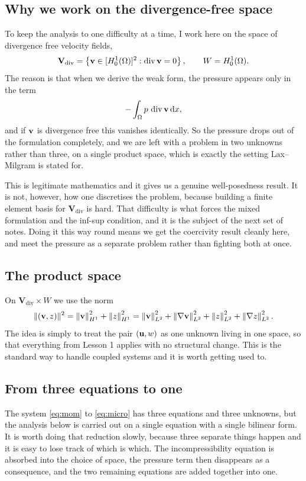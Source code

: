 \documentclass[11pt,a4paper]{article}
\begin{document}
\subsection{Why we work on the divergence-free space}

To keep the analysis to one difficulty at a time, I work here on the space of
divergence free velocity fields,
\[
  \mathbf{V}_{\mathrm{div}}
  = \left\{ \mathbf{v} \in [H^{1}_{0}(\Omega)]^{2} : \operatorname{div} \mathbf{v} = 0 \right\} ,
  \qquad
  W = H^{1}_{0}(\Omega) .
\]
The reason is that when we derive the weak form, the pressure appears only in
the term
\[
  - \int_\Omega p \,\operatorname{div} \mathbf{v} \,\mathrm{d}x ,
\]
and if $\mathbf{v}$ is divergence free this vanishes identically. So the pressure drops
out of the formulation completely, and we are left with a problem in two
unknowns rather than three, on a single product space, which is exactly the
setting Lax--Milgram is stated for.

This is legitimate mathematics and it gives us a genuine well-posedness result.
It is not, however, how one discretises the problem, because building a finite
element basis for $\mathbf{V}_{\mathrm{div}}$ is hard. That difficulty is what
forces the mixed formulation and the inf-sup condition, and it is the subject of
the next set of notes. Doing it this way round means we get the coercivity
result cleanly here, and meet the pressure as a separate problem rather than
fighting both at once.

\subsection{The product space}

On $\mathbf{V}_{\mathrm{div}} \times W$ we use the norm
\begin{equation}\label{eq:prodnorm}
  \lVert (\mathbf{v}, z) \rVert^{2}
  = \left\lVert \mathbf{v} \right\rVert_{H^{1}}^{2} + \left\lVert z \right\rVert_{H^{1}}^{2}
  = \left\lVert \mathbf{v} \right\rVert_{L^{2}}^{2} + \left\lVert \nabla \mathbf{v} \right\rVert_{L^{2}}^{2}
  + \left\lVert z \right\rVert_{L^{2}}^{2} + \left\lVert \nabla z \right\rVert_{L^{2}}^{2} .
\end{equation}
The idea is simply to treat the pair $(\mathbf{u}, w)$ as one unknown living in one
space, so that everything from Lesson 1 applies with no structural change. This
is the standard way to handle coupled systems and it is worth getting used to.

\subsection{From three equations to one}

The system \eqref{eq:mom} to \eqref{eq:micro} has three equations and three
unknowns, but the analysis below is carried out on a single equation with a
single bilinear form. It is worth doing that reduction slowly, because three
separate things happen and it is easy to lose track of which is which. The
incompressibility equation is absorbed into the choice of space, the pressure
term then disappears as a consequence, and the two remaining equations are added
together into one.
\end{document}
